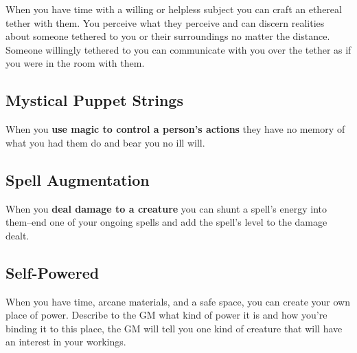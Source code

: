 When you have time with a willing or helpless subject you can craft an ethereal tether with them. You perceive what they perceive and can discern realities about someone tethered to you or their surroundings no matter the distance. Someone willingly tethered to you can communicate with you over the tether as if you were in the room with them.
\subsection{Mystical Puppet Strings}


 When you \textbf{use magic to control a person's actions}
 they have no memory of what you had them do and bear you no ill will.
\subsection{Spell Augmentation}


 When you \textbf{deal damage to a creature}
 you can shunt a spell's energy into them--end one of your ongoing spells and add the spell's level to the damage dealt.
\subsection{Self-Powered}


 When you have time, arcane materials, and a safe space, you can create your own place of power. Describe to the GM what kind of power it is and how you're binding it to this place, the GM will tell you one kind of creature that will have an interest in your workings.


